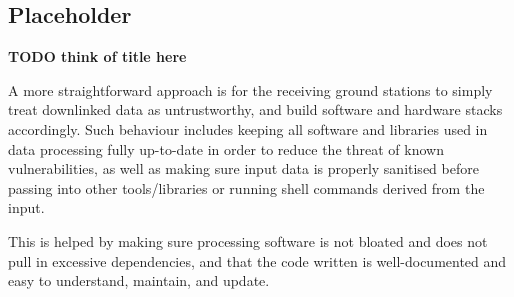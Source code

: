 \subsection{Placeholder}
\textbf{TODO think of title here}

A more straightforward approach is for the receiving ground stations to simply treat downlinked data as untrustworthy, and build software and hardware stacks accordingly.
Such behaviour includes keeping all software and libraries used in data processing fully up-to-date in order to reduce the threat of known vulnerabilities, as well as making sure input data is properly sanitised before passing into other tools/libraries or running shell commands derived from the input.

This is helped by making sure processing software is not bloated and does not pull in excessive dependencies, and that the code written is well-documented and easy to understand, maintain, and update.
